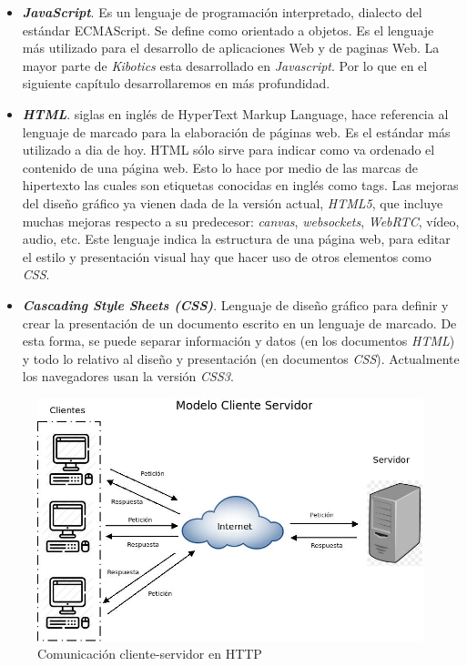 \begin{itemize} 
    \item \textit{\textbf{JavaScript}}. Es un lenguaje de programación interpretado, dialecto del estándar ECMAScript. Se define como orientado a objetos. Es el lenguaje más utilizado para el desarrollo de aplicaciones Web y de paginas Web. La mayor parte de \textit{Kibotics} esta desarrollado en \textit{Javascript}. Por lo que en el siguiente capítulo desarrollaremos en más profundidad.
    \item \textit{\textbf{HTML}}. siglas en inglés de HyperText Markup Language, hace referencia al lenguaje de marcado para la elaboración de páginas web. Es el estándar más utilizado a dia de hoy.\newline
HTML sólo sirve para indicar como va ordenado el contenido de una página web. Esto lo hace por medio de las marcas de hipertexto las cuales son etiquetas conocidas en inglés como tags. Las mejoras del diseño gráfico ya vienen dada de la versión actual, \textit{HTML5}, que incluye muchas mejoras respecto a su predecesor: \textit{canvas}, \textit{websockets}, \textit{WebRTC}, vídeo, audio, etc. Este lenguaje indica la estructura de una página web, para editar el estilo y presentación visual hay que hacer uso de otros elementos como \textit{CSS}.
    \item \textit{\textbf{Cascading Style Sheets (CSS)}}. Lenguaje de diseño gráfico para definir y crear la presentación de un documento escrito en un lenguaje de marcado. De esta forma, se puede separar información y datos (en los documentos \textit{HTML}) y todo lo relativo al diseño y presentación (en documentos \textit{CSS}). Actualmente los navegadores usan la versión \textit{CSS3}.

\end{itemize}

\begin{figure}[h]
\centering
\includegraphics[scale=0.4]{img/http.jpeg}
\caption{Comunicación cliente-servidor en HTTP} \label{fig:http}
\end{figure}
